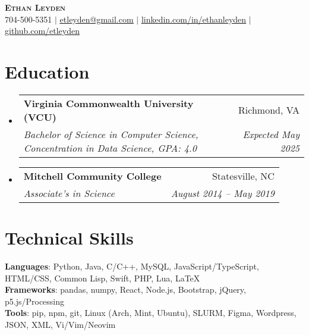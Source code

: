 \documentclass[letterpaper,11pt]{article}
\makeatletter
\newcommand{\resumeSubheading}[4]{
  \vspace{-2pt}\item
    \begin{tabular*}{0.97\textwidth}[t]{l@{\extracolsep{\fill}}r}
      \textbf{#1} & #2 \\
      \textit{\small#3} & \textit{\small #4} \\
    \end{tabular*}\vspace{-7pt}
}
\newcommand{\resumeSubHeadingListStart}{\begin{itemize}[leftmargin=0.15in, label={}]}
\newcommand{\resumeSubHeadingListEnd}{\end{itemize}}
\makeatother
\begin{document}

\begin{center}
    \textbf{\Huge \scshape Ethan Leyden} \\ \vspace{1pt}
    \small 704-500-5351 $|$ \href{mailto:x@x.com}{\underline{etleyden@gmail.com}} $|$ 
    \href{https://www.linkedin.com/in/ethanleyden}{\underline{linkedin.com/in/ethanleyden}} $|$
    \href{https://github.com/etleyden}{\underline{github.com/etleyden}}
\end{center}


\section{Education}
  \resumeSubHeadingListStart
    \resumeSubheading
      {Virginia Commonwealth University (VCU)}{Richmond, VA}
      {Bachelor of Science in Computer Science, Concentration in Data Science, GPA: 4.0}{Expected May 2025}
    \resumeSubheading
      {Mitchell Community College}{Statesville, NC}
      {Associate's in Science}{August 2014 -- May 2019}
  \resumeSubHeadingListEnd


\section{Technical Skills}
    \begin{itemize}[leftmargin=0.15in, label={}]
    \small{\item{
        \textbf{Languages}{: Python, Java, C/C++, MySQL, JavaScript/TypeScript, HTML/CSS, Common Lisp, Swift, PHP, Lua, LaTeX} \\
        \textbf{Frameworks}{: pandas, numpy, React, Node.js, Bootstrap, jQuery, p5.js/Processing} \\
        \textbf{Tools}{: pip, npm, git, Linux (Arch, Mint, Ubuntu), SLURM, Figma, Wordpress, JSON, XML, Vi/Vim/Neovim}
    }}  
    \end{itemize}
    

\end{document}
